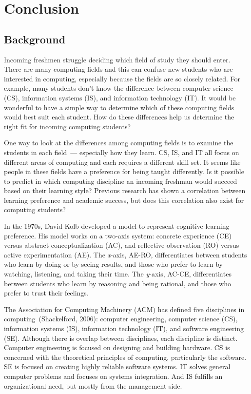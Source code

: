 \chapter{Conclusion}\label{chp:chapter5}
\section{Background}
Incoming freshmen struggle deciding which field of study they should enter. There are many computing fields and this can confuse new students who are interested in computing, especially because the fields are so closely related. For example, many students don't know the difference between computer science (CS), information systems (IS), and information technology (IT). It would be wonderful to have a simple way to determine which of these computing fields would best suit each student. How do these differences help us determine the right fit for incoming computing students?

One way to look at the differences among computing fields is to examine the students in each field~--- especially how they learn. CS, IS, and IT all focus on different areas of computing and each requires a different skill set. It seems like people in these fields have a preference for being taught differently. Is it possible to predict in which computing discipline an incoming freshman would succeed based on their learning style? Previous research has shown a correlation between learning preference and academic success, but does this correlation also exist for computing students?

In the 1970s, David Kolb developed a model to represent cognitive learning preference. His model works on a two-axis system: concrete experience (CE) versus abstract conceptualization (AC), and reflective observation (RO) versus active experimentation (AE). The \textit{x}-axis, AE-RO, differentiates between students who learn by doing or by seeing results, and those who prefer to learn by watching, listening, and taking their time. The \textit{y}-axis, AC-CE, differentiates between students who learn by reasoning and being rational, and those who prefer to trust their feelings.

The Association for Computing Machinery (ACM) has defined five disciplines in computing~(Shackelford, 2006): computer engineering, computer science (CS), information systems (IS), information technology (IT), and software engineering (SE). Although there is overlap between disciplines, each discipline is distinct. Computer engineering is focused on designing and building hardware. CS is concerned with the theoretical principles of computing, particularly the software. SE is focused on creating highly reliable software systems. IT solves general computer problems and focuses on systems integration. And IS fulfills an organizational need, but mostly from the management side.

